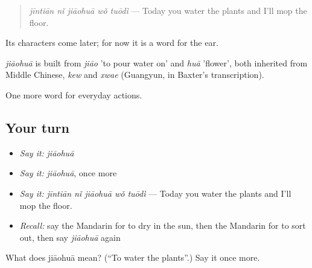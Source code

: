 \begin{quote}
\emph{jīntiān nǐ jiāohuā wǒ tuōdì} — Today you water the plants and I'll mop the floor.
\end{quote}

Its characters come later; for now it is a word for the ear.

\begin{cousinweb}
\emph{jiāohuā} is built from \emph{jiāo} 'to pour water on' and \emph{huā} 'flower', both inherited from Middle Chinese, \emph{kew} and \emph{xwae} (Guangyun, in Baxter's transcription).
\end{cousinweb}

\begin{grammarlens}[title={What you've built}]
One more word for everyday actions.
\end{grammarlens}

\subsection*{Your turn}
\begin{itemize}
\raggedright
  \item \emph{Say it:} \emph{jiāohuā}
  \item \emph{Say it:} \emph{jiāohuā}, once more
  \item \emph{Say it:} \emph{jīntiān nǐ jiāohuā wǒ tuōdì} — Today you water the plants and I'll mop the floor.
  \item \emph{Recall:} say the Mandarin for to dry in the sun, then the Mandarin for to sort out, then say \emph{jiāohuā} again
\end{itemize}

\begin{tcolorbox}[breakable,colback=teal!4,colframe=teal!35!black,title={Before you move on}]
What does jiāohuā mean? (\textquotedblleft{}To water the plants\textquotedblright{}.) Say it once more.
\end{tcolorbox}
